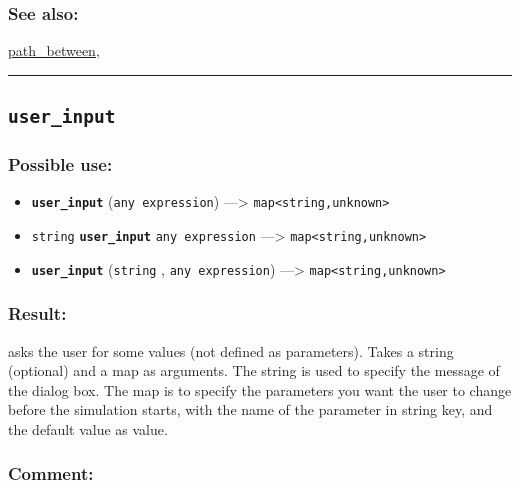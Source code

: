 \documentclass[]{book}
\providecommand{\tightlist}{%
  \setlength{\itemsep}{0pt}\setlength{\parskip}{0pt}}
\theoremstyle{definition}
\theoremstyle{definition}
\theoremstyle{definition}
\theoremstyle{remark}
\begin{document}
\subsubsection{See also:}\label{see-also-216}

\href{OperatorsNR\#path_between}{path\_between},

\begin{center}\rule{0.5\linewidth}{\linethickness}\end{center}

\subsection{\texorpdfstring{\texttt{user\_input}}{user\_input}}\label{user_input}

\subsubsection{Possible use:}\label{possible-use-546}

\begin{itemize}
\tightlist
\item
  \textbf{\texttt{user\_input}} (\texttt{any\ expression})
  ---\textgreater{} \texttt{map\textless{}string,unknown\textgreater{}}
\item
  \texttt{string} \textbf{\texttt{user\_input}} \texttt{any\ expression}
  ---\textgreater{} \texttt{map\textless{}string,unknown\textgreater{}}
\item
  \textbf{\texttt{user\_input}} (\texttt{string} ,
  \texttt{any\ expression}) ---\textgreater{}
  \texttt{map\textless{}string,unknown\textgreater{}}
\end{itemize}

\subsubsection{Result:}\label{result-526}

asks the user for some values (not defined as parameters). Takes a
string (optional) and a map as arguments. The string is used to specify
the message of the dialog box. The map is to specify the parameters you
want the user to change before the simulation starts, with the name of
the parameter in string key, and the default value as value.

\subsubsection{Comment:}\label{comment-104}
\end{document}
